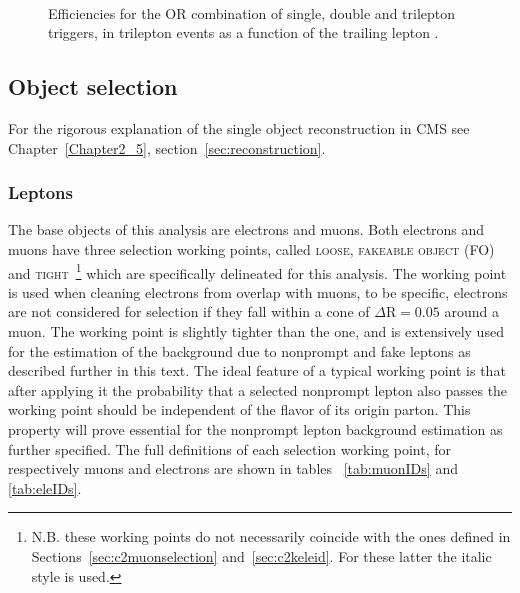 \begin{figure}[h]
{  }\\
  \caption{Efficiencies for the OR combination of single, double and trilepton triggers, in trilepton events as a function
  of the trailing lepton \pt.}
  \label{fig:3l1l1lEff}
\end{figure}
\fi

\subsection{Object selection}\label{sec:object}
For the rigorous explanation of the single object reconstruction in
CMS see Chapter~\ref{Chapter2_5}, section~\ref{sec:reconstruction}.

\subsubsection{Leptons}
The base objects of this analysis are electrons and muons. Both
electrons and muons have three selection working points, called
\textsc{loose}, \textsc{fakeable object} (\textsc{FO}) and \textsc{tight}~\footnote{
N.B. these working points do not necessarily coincide with the ones
defined in Sections~\ref{sec:c2muonselection}
and~\ref{sec:c2keleid}. For these latter the italic style is used.} which
are specifically delineated for this analysis. The \lo working point
is used when cleaning electrons from overlap with muons, to be
specific, electrons are not considered for selection if they fall
within a cone of $\Delta \mathrm{R} = 0.05$ around a \lo muon. The
\fo working point is slightly tighter than the \lo one, and is
extensively used for the estimation of the background due to
nonprompt and fake leptons as described further in this text. The
ideal feature of a typical \fo working point is that after applying it
the probability that a selected nonprompt lepton also passes the
\ti working point should be independent
 of the flavor of its origin parton.
 This property will prove essential for the nonprompt lepton background estimation as further specified. The full definitions of each selection working point, for respectively muons and electrons are shown in tables ~\ref{tab:muonIDs} and \ref{tab:eleIDs}.

